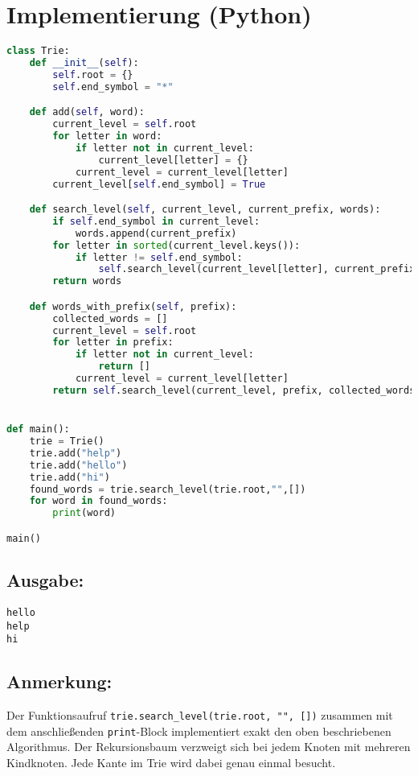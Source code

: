 \newpage

\section*{Implementierung (Python)}

\begin{lstlisting}[language=Python]
class Trie:
    def __init__(self):
        self.root = {}
        self.end_symbol = "*"

    def add(self, word):
        current_level = self.root
        for letter in word:
            if letter not in current_level:
                current_level[letter] = {}
            current_level = current_level[letter]
        current_level[self.end_symbol] = True

    def search_level(self, current_level, current_prefix, words):
        if self.end_symbol in current_level:
            words.append(current_prefix)
        for letter in sorted(current_level.keys()):
            if letter != self.end_symbol:
                self.search_level(current_level[letter], current_prefix + letter, words)
        return words

    def words_with_prefix(self, prefix):
        collected_words = []
        current_level = self.root
        for letter in prefix:
            if letter not in current_level:
                return []
            current_level = current_level[letter]
        return self.search_level(current_level, prefix, collected_words)


def main():
    trie = Trie()
    trie.add("help")
    trie.add("hello")
    trie.add("hi")
    found_words = trie.search_level(trie.root,"",[])
    for word in found_words:
        print(word)

main()
\end{lstlisting}

\subsection*{Ausgabe:}
\begin{verbatim}
hello
help
hi
\end{verbatim}

\subsection*{Anmerkung:}

Der Funktionsaufruf \texttt{trie.search\_level(trie.root, "", [])} zusammen mit dem anschließenden \texttt{print}-Block implementiert exakt den oben beschriebenen Algorithmus. Der Rekursionsbaum verzweigt sich bei jedem Knoten mit mehreren Kindknoten. Jede Kante im Trie wird dabei genau einmal besucht.